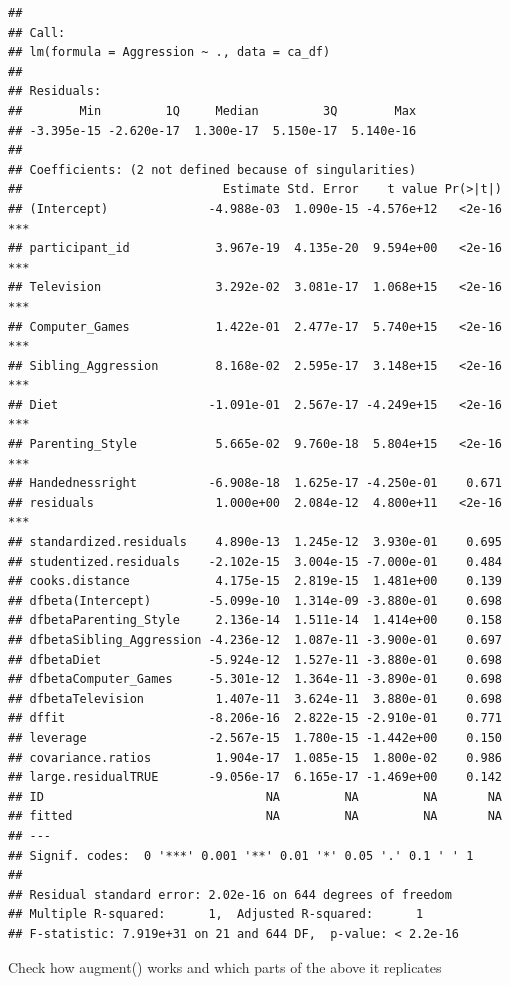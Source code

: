 \documentclass[
]{book}
\begin{document}
\begin{verbatim}
## 
## Call:
## lm(formula = Aggression ~ ., data = ca_df)
## 
## Residuals:
##        Min         1Q     Median         3Q        Max 
## -3.395e-15 -2.620e-17  1.300e-17  5.150e-17  5.140e-16 
## 
## Coefficients: (2 not defined because of singularities)
##                            Estimate Std. Error    t value Pr(>|t|)    
## (Intercept)              -4.988e-03  1.090e-15 -4.576e+12   <2e-16 ***
## participant_id            3.967e-19  4.135e-20  9.594e+00   <2e-16 ***
## Television                3.292e-02  3.081e-17  1.068e+15   <2e-16 ***
## Computer_Games            1.422e-01  2.477e-17  5.740e+15   <2e-16 ***
## Sibling_Aggression        8.168e-02  2.595e-17  3.148e+15   <2e-16 ***
## Diet                     -1.091e-01  2.567e-17 -4.249e+15   <2e-16 ***
## Parenting_Style           5.665e-02  9.760e-18  5.804e+15   <2e-16 ***
## Handednessright          -6.908e-18  1.625e-17 -4.250e-01    0.671    
## residuals                 1.000e+00  2.084e-12  4.800e+11   <2e-16 ***
## standardized.residuals    4.890e-13  1.245e-12  3.930e-01    0.695    
## studentized.residuals    -2.102e-15  3.004e-15 -7.000e-01    0.484    
## cooks.distance            4.175e-15  2.819e-15  1.481e+00    0.139    
## dfbeta(Intercept)        -5.099e-10  1.314e-09 -3.880e-01    0.698    
## dfbetaParenting_Style     2.136e-14  1.511e-14  1.414e+00    0.158    
## dfbetaSibling_Aggression -4.236e-12  1.087e-11 -3.900e-01    0.697    
## dfbetaDiet               -5.924e-12  1.527e-11 -3.880e-01    0.698    
## dfbetaComputer_Games     -5.301e-12  1.364e-11 -3.890e-01    0.698    
## dfbetaTelevision          1.407e-11  3.624e-11  3.880e-01    0.698    
## dffit                    -8.206e-16  2.822e-15 -2.910e-01    0.771    
## leverage                 -2.567e-15  1.780e-15 -1.442e+00    0.150    
## covariance.ratios         1.904e-17  1.085e-15  1.800e-02    0.986    
## large.residualTRUE       -9.056e-17  6.165e-17 -1.469e+00    0.142    
## ID                               NA         NA         NA       NA    
## fitted                           NA         NA         NA       NA    
## ---
## Signif. codes:  0 '***' 0.001 '**' 0.01 '*' 0.05 '.' 0.1 ' ' 1
## 
## Residual standard error: 2.02e-16 on 644 degrees of freedom
## Multiple R-squared:      1,  Adjusted R-squared:      1 
## F-statistic: 7.919e+31 on 21 and 644 DF,  p-value: < 2.2e-16
\end{verbatim}

Check how augment() works and which parts of the above it replicates
\end{document}
